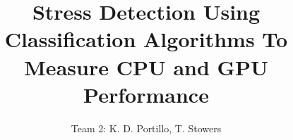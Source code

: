 \documentclass{IEEEtran}
\begin{document}
 
\title{Stress Detection Using Classification Algorithms To Measure CPU and GPU Performance}
\author{Team 2: K. D. Portillo, T. Stowers}
\maketitle
{}





\end{document}
